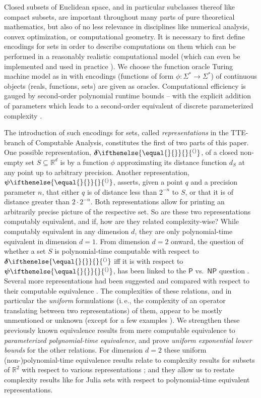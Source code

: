 \documentclass{CSML}
\newcommand{\representation}[2]{ #1\ifnotempty{#2}{^{(#2)}} }
\newcommand{\IR}{\mathbb{R}}
\newcommand{\Sast}{\Sigma^\ast}
\newcommand{\PTime}{\mathsf{P}}
\newcommand{\NPTime}{\mathsf{NP}}
\newcommand{\distrep}[1][\empty]{ \representation{\bm{\delta}}{#1} }
\newcommand{\setrep}[1][\empty]{ \representation{\bm{\psi}}{#1} }
\newcommand{\ifnotempty}[2]{ \ifthenelse{ \equal{#1}{\empty} }{}{#2} }
\newcommand{\ie}{\mbox{i.\,e.}\xspace}
\newcommand{\wrt}{with respect to\xspace}
\begin{document}
Closed subsets of Euclidean space, and in particular subclasses thereof like
compact subsets, are important throughout many parts of pure theoretical
mathematics, but also of no less relevance in disciplines like numerical
analysis, convex optimization, or computational geometry. It is
necessary to first define encodings for sets in order to describe computations
on them which can be performed in a reasonably realistic computational model
(which can even be implemented and used in practice \cite{Mueller:iRRAM}).
We choose the function oracle Turing machine model as in
\cite{KF82,Ko91,KawamuraCook} with encodings (functions of form
$\phi \colon \Sast \to \Sast$) of continuous objects (reals, functions, sets)
are given as oracles.
Computational efficiency is gauged by second-order polynomial runtime bounds \cite{KawamuraCook}
-- with the explicit addition of parameters which leads to a second-order
equivalent of discrete parameterized complexity \cite{KMRZarXiv,Ret13}.

The introduction of such encodings for sets, called \emph{representations} in
the TTE-branch of Computable Analysis, %
constitutes the first of two parts of this paper.
One possible representation, $\distrep$, of a closed non-empty set
$S \subseteq \IR^d$ is by a function $\phi$ approximating its distance
function $d_S$ at any point up to arbitrary precision.
Another representation, $\setrep$, asserts,
given a point $q$ and a precision parameter $n$, that either
$q$ is of distance less than $2^{-n}$ to $S$, or that it is of distance
greater than $2 \cdot 2^{-n}$. Both representations allow for printing an
arbitrarily precise picture of the respective set. So are these two
representations computably equivalent, and if, how are they related
complexity-wise? While computably equivalent in any dimension $d$, they are
only polynomial-time equivalent in dimension $d = 1$.
From dimension $d = 2$ onward, the question of whether a set $S$ is polynomial-time
computable with respect to $\distrep$ iff it is \wrt $\setrep$, has been linked
to the $\PTime$ vs.~$\NPTime$ question \cite{Braverman04}.
Several more representations had been suggested
\cite{Weih87,Hertling02,RettingerHabil}
and compared with respect to their computable equivalence
\cite{KuSch95,BW99,Weih00,Ziegler02,Hertling02,BrattkaPresser}.
The complexities of these relations, and in particular the \emph{uniform}
formulations (\ie, the complexity of an operator translating between two
representations) of them, appear to be mostly unmentioned or unknown (except
for a few examples \cite{GLS88,Braverman04}). We strengthen these
previously known equivalence results from mere computable equivalence to
\emph{parameterized polynomial-time equivalence}, and prove \emph{uniform
exponential lower bounds} for the other relations.
For dimension $d = 2$ these uniform (non-)polynomial-time equivalence results
relate to complexity results for subsets of $\IR^2$ with respect to various
representations \cite{CK95:Rtwo,CK05:distance}; and they allow us to restate
complexity results like for Julia sets \cite{RW02:JuliaSets,Brav05:JuliaSets}
with respect to polynomial-time equivalent representations.
\end{document}
